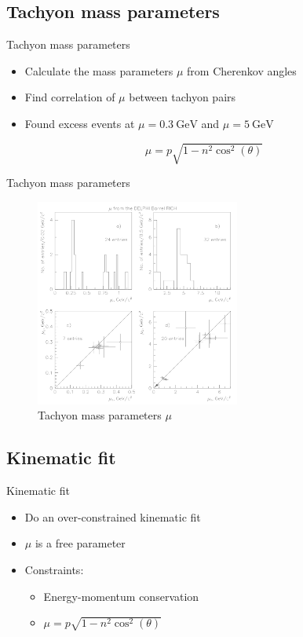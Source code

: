 \documentclass{beamer}
\begin{document}
\subsection{Tachyon mass parameters}
\begin{frame}{Tachyon mass parameters}
  \begin{itemize}
    \item{Calculate the mass parameters $\mu$ from Cherenkov angles}
    \item{Find correlation of $\mu$ between tachyon pairs}
    \item{Found excess events at $\mu = \SI{0.3}{\giga\eV}$ and $\mu = \SI{5}{\giga\eV}$}
  \end{itemize}
  \vspace{1cm}
  \begin{equation*}
    \mu = p\sqrt{1 - n^2\cos^2(\theta)}
  \end{equation*}
\end{frame}

\begin{frame}{Tachyon mass parameters}
  \begin{figure}
    \centering
    \includegraphics[width = 0.6\textwidth]{MassParameters.png}
    \caption{Tachyon mass parameters $\mu$}
  \end{figure}
\end{frame}

\subsection{Kinematic fit}
\begin{frame}{Kinematic fit}
  \begin{itemize}
    \item{Do an over-constrained kinematic fit}
    \item{$\mu$ is a free parameter}
    \item{Constraints:}
    \begin{itemize}
      \item{Energy-momentum conservation}
      \item{$\mu = p\sqrt{1 - n^2\cos^2(\theta)}$}
    \end{itemize}
  \end{itemize}
\end{frame}
\end{document}
